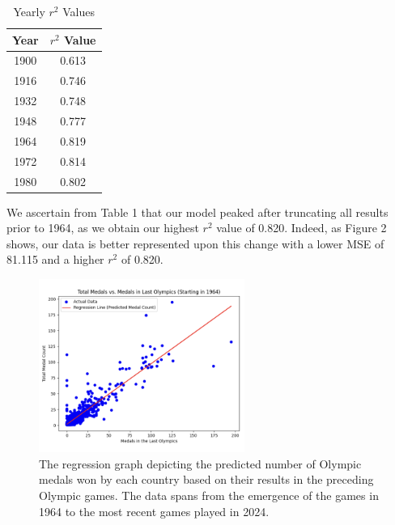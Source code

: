 \documentclass{mcmthesis}
\begin{document}
\begin{table}[h!]
\centering
\begin{tabular}{|c|c|}
\hline
\textbf{Year} & \textbf{\( r^2 \) Value} \\ \hline
1900          & 0.613                    \\ \hline
1916          & 0.746                    \\ \hline
1932          & 0.748                    \\ \hline
1948          & 0.777                    \\ \hline
1964          & 0.819                    \\ \hline
1972          & 0.814                    \\ \hline
1980          & 0.802                    \\ \hline
\end{tabular}
\caption{Yearly \( r^2 \) Values}
\label{tab:r2_values}
\end{table}


We ascertain from Table 1 that our model peaked after truncating all results prior to 1964, as we obtain our highest $r^2$ value of 0.820. Indeed, as Figure 2 shows, our data is better represented upon this change with a lower MSE of 81.115 and a higher $r^2$ of 0.820. \par
\begin{figure}[h] %
    \centering
    \includegraphics[width=0.6\textwidth]{figures/Regression_Graph_One.png}
    \caption{The regression graph depicting the predicted number of Olympic medals won by each country based on their results in the preceding Olympic games. The data spans from the emergence of the games in 1964 to the most recent games played in 2024.}
    \label{fig:image2}
\end{figure}
\end{document}
